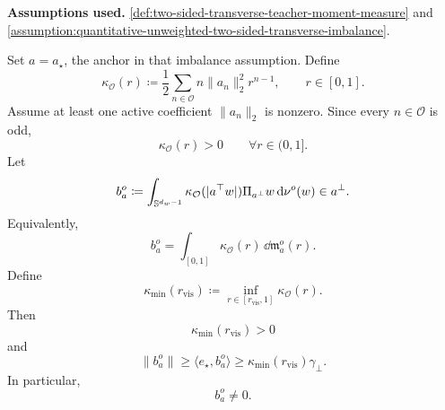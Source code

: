 \begin{lemma}
\label{lem:quantitative-control-weighted-transverse-moment}
\textbf{Assumptions used.}
\cref{def:two-sided-transverse-teacher-moment-measure} and 
\cref{assumption:quantitative-unweighted-two-sided-transverse-imbalance}.

Set \(a=a_\star\), the anchor in that imbalance assumption.  Define
\[
    \kappa_{\mathcal O}(r)
    \coloneq
    \frac12
    \sum_{n\in\mathcal O}
    n\|a_n\|_2^2 r^{n-1},
    \qquad r\in[0,1].
\]
Assume at least one active coefficient \(\|a_n\|_2\) is nonzero.  Since every
\(n\in\mathcal O\) is odd,
\[
    \kappa_{\mathcal O}(r)>0
    \qquad
    \forall r\in(0,1].
\]
Let
\[
    b_a^o
    \coloneq
    \int_{\mathbb{S}^{d_w-1}}
    \kappa_{\mathcal O}(|a^\top w|)
    \Pi_{a^\perp}w
    \,\dd\nu^o(w)
    \in a^\perp .
\]
Equivalently,
\[
    b_a^o
    =
    \int_{[0,1]}
    \kappa_{\mathcal O}(r)\,\dd\mathfrak m_a^o(r).
\]
Define
\[
    \kappa_{\min}(r_{\mathrm{vis}})
    \coloneq
    \inf_{r\in[r_{\mathrm{vis}},1]}
    \kappa_{\mathcal O}(r).
\]
Then
\[
    \kappa_{\min}(r_{\mathrm{vis}})>0
\]
and
\[
    \|b_a^o\|
    \ge
    \langle e_\star,b_a^o\rangle
    \ge
    \kappa_{\min}(r_{\mathrm{vis}})\gamma_\perp.
\]
In particular,
\[
    b_a^o\neq0.
\]
\end{lemma}

